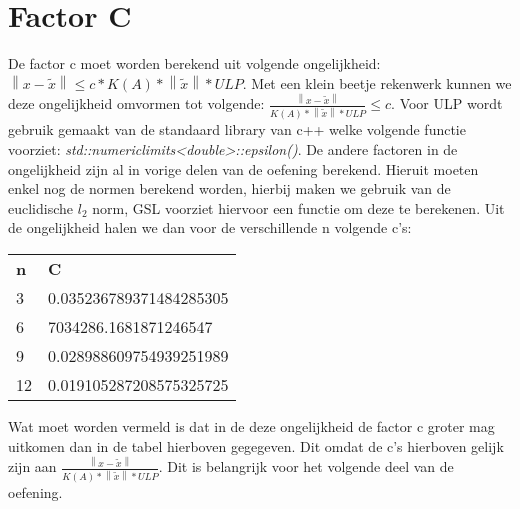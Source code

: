 \documentclass[10pt,a4paper]{article}
\begin{document}
\section{Factor C}
De factor c moet worden berekend uit volgende ongelijkheid: $\left \| x - \tilde{x} \right \| \leqslant  c*K(A)*\left \| \tilde{x} \right \|*ULP$. Met een klein beetje rekenwerk kunnen we deze ongelijkheid omvormen tot volgende: $\frac{\left \| x - \tilde{x} \right \|}{ K(A)*\left \| \tilde{x} \right \|*ULP} \leqslant  c $. Voor ULP wordt gebruik gemaakt van de standaard library van c++ welke volgende functie voorziet: \textit{std::numericlimits<double>::epsilon()}. De andere factoren in de ongelijkheid zijn al in vorige delen van de oefening berekend. Hieruit moeten enkel nog de normen berekend worden, hierbij maken we gebruik van de euclidische $l_{2}$ norm, GSL voorziet hiervoor een functie om deze te berekenen. Uit de ongelijkheid halen we dan voor de verschillende n volgende c's:
\begin{center}
\begin{tabular}{ll}
\textbf{n} & \textbf{C} \\
3          & 0.035236789371484285305            \\
6          & 7034286.1681871246547           \\
9          &  0.028988609754939251989          \\
12         & 0.019105287208575325725           
\end{tabular}
\end{center}
Wat moet worden vermeld is dat in de deze ongelijkheid de factor c groter mag uitkomen dan in de tabel hierboven gegegeven. Dit omdat de c's hierboven gelijk zijn aan $\frac{\left \| x - \tilde{x} \right \|}{ K(A)*\left \| \tilde{x} \right \|*ULP}$. Dit is belangrijk voor het volgende deel van de oefening.
\end{document}
